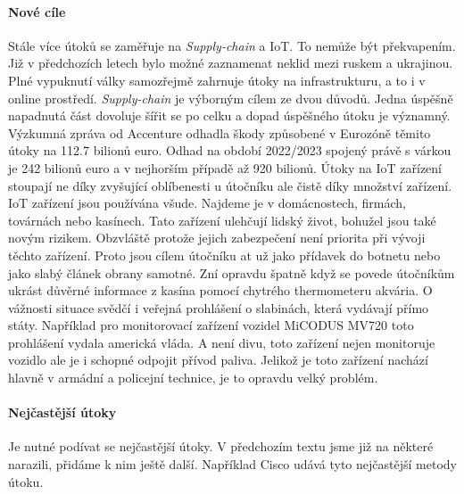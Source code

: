 \paragraph{Nové cíle}
Stále více útoků se zaměřuje na \textit{Supply-chain} a \ac{IoT}.
To nemůže být překvapením.
Již v předchozích letech bylo možné zaznamenat neklid mezi ruskem a ukrajinou.
Plné vypuknutí války samozřejmě zahrnuje útoky na infrastrukturu, a to i v online prostředí.
\textit{Supply-chain} je výborným cílem ze dvou důvodů.
Jedna úspěšně napadnutá část dovoluje šířit se po celku a dopad úspěšného útoku je významný.
Výzkumná zpráva od Accenture\cite{accenture_supplu-chain-disruption} odhadla škody způsobené v Eurozóně těmito útoky na 112.7 bilionů euro.
Odhad na období 2022/2023 spojený právě s várkou je 242 bilionů euro a v nejhorším případě až 920 bilionů.
Útoky na \ac{IoT} zařízení stoupají ne díky zvyšující oblíbenesti u útočníku ale čistě díky množství zařízení.
\ac{IoT} zařízení jsou používána všude.
Najdeme je v domácnostech, firmách, továrnách nebo kasínech.
Tato zařízení ulehčují lidský život, bohužel jsou také novým rizikem.
Obzvláště protože jejich zabezpečení není priorita při vývoji těchto zařízení.
Proto jsou cílem útočníku at už jako přídavek do botnetu nebo jako slabý článek obrany samotné.
Zní opravdu špatně když se povede útočníkům ukrást důvěrné informace z kasína pomocí chytrého thermometeru akvária\cite{casino_thermometer}.
O vážnosti situace svědčí i veřejná prohlášení o slabinách, která vydávají přímo státy.
Například pro monitorovací zařízení vozidel MiCODUS MV720 toto prohlášení vydala americká vláda\cite{america_gov_advisories_micodus}.
A není divu, toto zařízení nejen monitoruje vozidlo ale je i schopné odpojit přívod paliva.
Jelikož je toto zařízení nachází hlavně v armádní a policejní technice, je to opravdu velký problém.\cite{securityintelligence_most_common_2022_attacks}

\paragraph{Nejčastější útoky}
Je nutné podívat se nejčastější útoky.
V předchozím textu jsme již na některé narazili, přidáme k nim ještě další.
Například Cisco udává tyto nejčastější metody útoku\cite{cisco_most_common_attack}.

